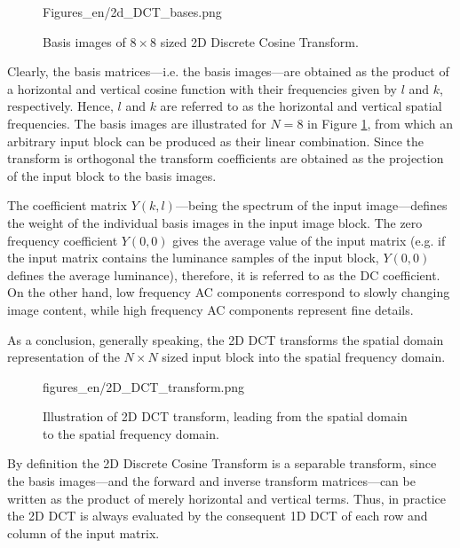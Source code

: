 \begin{figure}[]
	\centering
	\begin{minipage}[c]{0.68\textwidth}
	\begin{overpic}[width = 1\columnwidth ]{Figures_en/2d_DCT_bases.png}
	\end{overpic}   \end{minipage}\hfill
		\begin{minipage}[c]{0.3\textwidth}
	\caption{Basis images of $8\times8$ sized 2D Discrete Cosine Transform.}
	\label{Fig:2D_DCT}  \end{minipage}
\end{figure}
Clearly, the basis matrices---i.e. the basis images---are obtained as the product of a horizontal and vertical cosine function with their frequencies given by $l$ and $k$, respectively.
Hence, $l$ and $k$ are referred to as the horizontal and vertical spatial frequencies.
The basis images are illustrated for $N=8$ in Figure \ref{Fig:2D_DCT}, from which an arbitrary input block can be produced as their linear combination.
Since the transform is orthogonal the transform coefficients are obtained as the projection of the input block to the basis images.

The coefficient matrix $Y(k,l)$---being the spectrum of the input image---defines the weight of the individual basis images in the input image block.
The zero frequency coefficient $Y(0,0)$ gives the average value of the input matrix (e.g. if the input matrix contains the luminance samples of the input block, $Y(0,0)$ defines the average luminance), therefore, it is referred to as the DC coefficient.
On the other hand, low frequency AC components correspond to slowly changing image content, while high frequency AC components represent fine details.

As a conclusion, generally speaking, the 2D DCT transforms the spatial domain representation of the $N\times N$ sized input block into the spatial frequency domain. 
\begin{figure}[h!]
	\centering
	\begin{overpic}[width = 1\columnwidth ]{figures_en/2D_DCT_transform.png}
	\end{overpic}
	\caption{Illustration of 2D DCT transform, leading from the spatial domain to the spatial frequency domain.}
	\label{Fig:2d_dct}
\end{figure}

\vspace{3mm}
By definition the 2D Discrete Cosine Transform is a separable transform, since the basis images---and the forward and inverse transform matrices---can be written as the product of merely horizontal and vertical terms.
Thus, in practice the 2D DCT is always evaluated by the consequent 1D DCT of each row and column of the input matrix.


